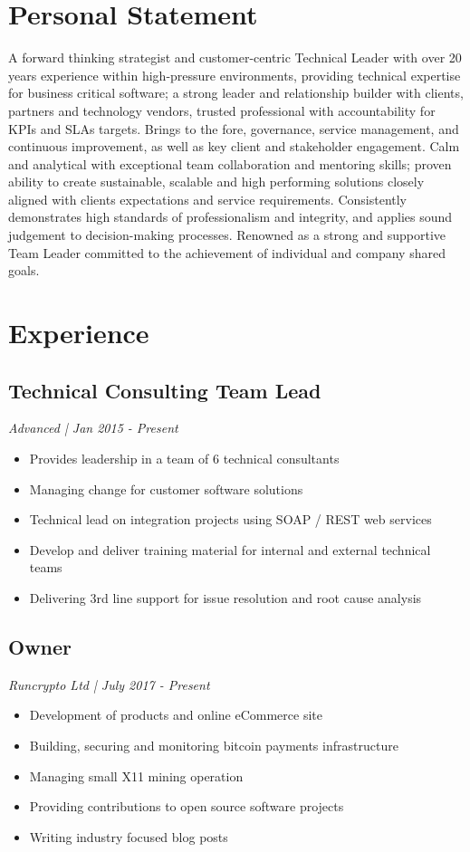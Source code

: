 \documentclass[a4paper]{article}
\begin{document}
\begin{minipage}[t]{0.60\textwidth}
%
%
%
\section{Personal Statement}
A forward thinking strategist and customer-centric Technical Leader with over 20 years experience within high-pressure environments, providing technical expertise for business critical software; a strong leader and relationship builder with clients, partners and technology vendors, trusted professional with accountability for KPIs and SLAs targets. Brings to the fore, governance, service management, and continuous improvement, as well as key client and stakeholder engagement. Calm and analytical with exceptional team collaboration and mentoring skills; proven ability to create sustainable, scalable and high performing solutions closely aligned with clients expectations and service requirements. Consistently demonstrates high standards of professionalism and integrity, and applies sound judgement to decision-making processes. Renowned as a strong and supportive Team Leader committed to the achievement of individual and company shared goals.
%
%
%
\vspace{-12pt}
\section{Experience}
	\subsection{Technical Consulting Team Lead}
	\textit{ Advanced | Jan 2015 - Present }
	\begin{itemize}
	\vspace{6pt}
		\item Provides leadership in a team of 6 technical consultants
		\item Managing change for customer software solutions
		\item Technical lead on integration projects using SOAP / REST web services
		\item Develop and deliver training material for internal and external technical teams
		\item Delivering 3rd line support for issue resolution and root cause analysis
	\end{itemize}
	\subsection{Owner}
	\textit{ Runcrypto Ltd | July 2017 - Present }
	\begin{itemize}
		\item Development of products and online eCommerce site
		\item Building, securing and monitoring bitcoin payments infrastructure
		\item Managing small X11 mining operation
		\item Providing contributions to open source software projects
		\item Writing industry focused blog posts
	\end{itemize}

\end{minipage}
\end{document}
